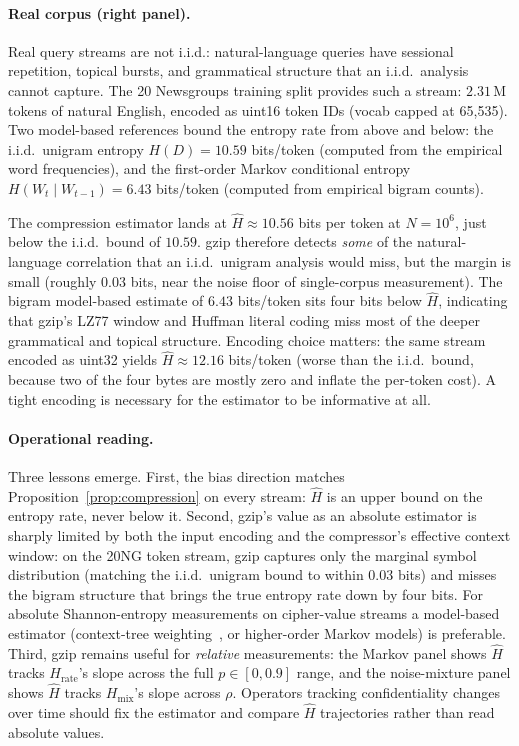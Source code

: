 \documentclass[11pt]{article}
\theoremstyle{definition}
\theoremstyle{plain}
\theoremstyle{remark}
\begin{document}
\paragraph{Real corpus (right panel).}
Real query streams are not i.i.d.: natural-language queries have
sessional repetition, topical bursts, and grammatical structure
that an i.i.d.\ analysis cannot capture.  The 20 Newsgroups
training split provides such a stream: $2.31\,\text{M}$ tokens of
natural English, encoded as uint16 token IDs (vocab capped at
65{,}535).  Two model-based references bound the entropy rate from
above and below: the i.i.d.\ unigram entropy
$H(D) = 10.59$ bits/token (computed from the empirical word
frequencies), and the first-order Markov conditional entropy
$H(W_t \mid W_{t-1}) = 6.43$ bits/token (computed from empirical
bigram counts).

The compression estimator lands at $\hat H \approx 10.56$ bits per
token at $N = 10^6$, just below the i.i.d.\ bound of $10.59$.
gzip therefore detects \emph{some} of the natural-language
correlation that an i.i.d.\ unigram analysis would miss, but the
margin is small (roughly $0.03$ bits, near the noise floor of
single-corpus measurement).  The bigram model-based estimate of
$6.43$ bits/token sits four bits below $\hat H$, indicating that
gzip's LZ77 window and Huffman literal coding miss most of the
deeper grammatical and topical structure.  Encoding choice matters:
the same stream encoded as uint32 yields $\hat H \approx 12.16$
bits/token (worse than the i.i.d.\ bound, because two of the four
bytes are mostly zero and inflate the per-token cost).  A tight
encoding is necessary for the estimator to be informative at all.

\paragraph{Operational reading.}
Three lessons emerge.  First, the bias direction matches
Proposition~\ref{prop:compression} on every stream: $\hat H$ is an
upper bound on the entropy rate, never below it.  Second,
gzip's value as an absolute estimator is sharply limited by both
the input encoding and the compressor's effective context window:
on the 20NG token stream, gzip captures only the marginal symbol
distribution (matching the i.i.d.\ unigram bound to within
$0.03$ bits) and misses the bigram structure that brings the true
entropy rate down by four bits.  For absolute Shannon-entropy
measurements on cipher-value streams a model-based estimator
(context-tree weighting~\cite{cover2006elements}, or higher-order
Markov models) is preferable.  Third, gzip remains useful for
\emph{relative} measurements: the Markov panel shows $\hat H$
tracks $H_{\mathrm{rate}}$'s slope across the full
$p \in [0, 0.9]$ range, and the noise-mixture panel shows $\hat H$
tracks $H_{\mathrm{mix}}$'s slope across $\rho$.  Operators
tracking confidentiality changes over time should fix the
estimator and compare $\hat H$ trajectories rather than read
absolute values.
\end{document}
